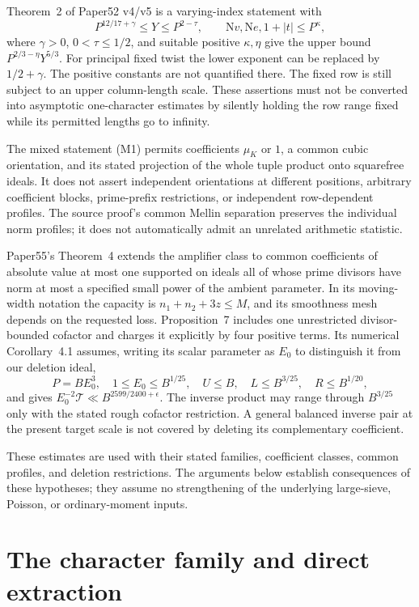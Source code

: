 \documentclass[11pt]{article}
\theoremstyle{remark}\newtheorem{remark}[theorem]{Remark}
\newcommand{\N}{\mathrm N}
\begin{document}
Theorem~2 of Paper52 v4/v5 is a varying-index statement with
\[
P^{12/17+\gamma}\le Y\le P^{2-\tau},\qquad
\N v,\N e,1+|t|\le P^\kappa,
\]
where $\gamma>0$, $0<\tau\le1/2$, and suitable positive $\kappa,\eta$ give the upper bound $P^{2/3-\eta}Y^{5/3}$. For principal fixed twist the lower exponent can be replaced by $1/2+\gamma$. The positive constants are not quantified there. The fixed row is still subject to an upper column-length scale. These assertions must not be converted into asymptotic one-character estimates by silently holding the row range fixed while its permitted lengths go to infinity.

The mixed statement (M1) permits coefficients $\mu_K$ or $1$, a common cubic orientation, and its stated projection of the whole tuple product onto squarefree ideals. It does not assert independent orientations at different positions, arbitrary coefficient blocks, prime-prefix restrictions, or independent row-dependent profiles. The source proof's common Mellin separation preserves the individual norm profiles; it does not automatically admit an unrelated arithmetic statistic.

Paper55's Theorem~4 extends the amplifier class to common coefficients of absolute value at most one supported on ideals all of whose prime divisors have norm at most a specified small power of the ambient parameter. In its moving-width notation the capacity is $n_1+n_2+3z\le M$, and its smoothness mesh depends on the requested loss. Proposition~7 includes one unrestricted divisor-bounded cofactor and charges it explicitly by four positive terms. Its numerical Corollary~4.1 assumes, writing its scalar parameter as $E_0$ to distinguish it from our deletion ideal,
\[
P=BE_0^3,\quad 1\le E_0\le B^{1/25},\quad
U\le B,\quad L\le B^{3/25},\quad R\le B^{1/20},
\]
and gives $E_0^{-2}\mathcal T\ll B^{2599/2400+\epsilon}$. The inverse product may range through $B^{3/25}$ only with the stated rough cofactor restriction. A general balanced inverse pair at the present target scale is not covered by deleting its complementary coefficient.

These estimates are used with their stated families, coefficient classes, common profiles, and deletion restrictions. The arguments below establish consequences of these hypotheses; they assume no strengthening of the underlying large-sieve, Poisson, or ordinary-moment inputs.

\section{The character family and direct extraction}\label{sec:character}
\end{document}

